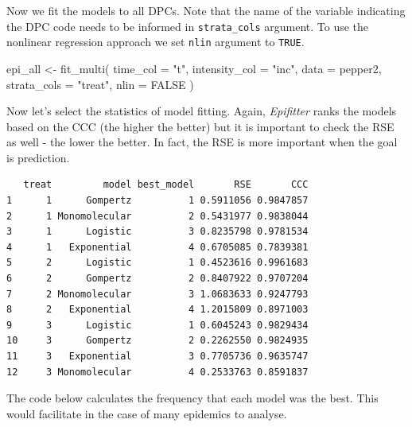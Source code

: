 \documentclass[
  letterpaper,
]{book}
\newenvironment{Shaded}{\begin{snugshade}}{\end{snugshade}}
\newcommand{\AttributeTok}[1]{\textcolor[rgb]{0.40,0.45,0.13}{#1}}
\newcommand{\ConstantTok}[1]{\textcolor[rgb]{0.56,0.35,0.01}{#1}}
\newcommand{\FunctionTok}[1]{\textcolor[rgb]{0.28,0.35,0.67}{#1}}
\newcommand{\NormalTok}[1]{\textcolor[rgb]{0.00,0.23,0.31}{#1}}
\newcommand{\OtherTok}[1]{\textcolor[rgb]{0.00,0.23,0.31}{#1}}
\newcommand{\SpecialCharTok}[1]{\textcolor[rgb]{0.37,0.37,0.37}{#1}}
\newcommand{\StringTok}[1]{\textcolor[rgb]{0.13,0.47,0.30}{#1}}
\begin{document}
Now we fit the models to all DPCs. Note that the name of the variable
indicating the DPC code needs to be informed in \texttt{strata\_cols}
argument. To use the nonlinear regression approach we set \texttt{nlin}
argument to \texttt{TRUE}.

\begin{Shaded}
\begin{Highlighting}[]
\NormalTok{epi\_all }\OtherTok{\textless{}{-}} \FunctionTok{fit\_multi}\NormalTok{(}
  \AttributeTok{time\_col =} \StringTok{"t"}\NormalTok{,}
  \AttributeTok{intensity\_col =} \StringTok{"inc"}\NormalTok{,}
  \AttributeTok{data =}\NormalTok{ pepper2,}
  \AttributeTok{strata\_cols =} \StringTok{"treat"}\NormalTok{,}
  \AttributeTok{nlin =} \ConstantTok{FALSE}
\NormalTok{)}
\end{Highlighting}
\end{Shaded}

Now let's select the statistics of model fitting. Again,
\emph{Epifitter} ranks the models based on the CCC (the higher the
better) but it is important to check the RSE as well - the lower the
better. In fact, the RSE is more important when the goal is prediction.

\begin{Shaded}
\end{Shaded}

\begin{verbatim}
   treat         model best_model       RSE       CCC
1      1      Gompertz          1 0.5911056 0.9847857
2      1 Monomolecular          2 0.5431977 0.9838044
3      1      Logistic          3 0.8235798 0.9781534
4      1   Exponential          4 0.6705085 0.7839381
5      2      Logistic          1 0.4523616 0.9961683
6      2      Gompertz          2 0.8407922 0.9707204
7      2 Monomolecular          3 1.0683633 0.9247793
8      2   Exponential          4 1.2015809 0.8971003
9      3      Logistic          1 0.6045243 0.9829434
10     3      Gompertz          2 0.2262550 0.9824935
11     3   Exponential          3 0.7705736 0.9635747
12     3 Monomolecular          4 0.2533763 0.8591837
\end{verbatim}

The code below calculates the frequency that each model was the best.
This would facilitate in the case of many epidemics to analyse.
\end{document}
